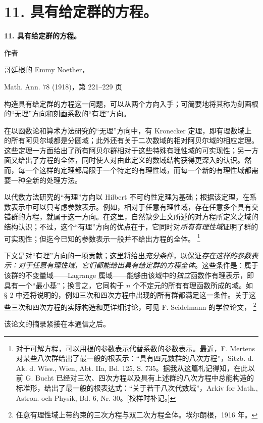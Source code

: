 \documentclass[11pt]{article}
\providecommand{\glqq}{“}
\providecommand{\grqq}{”}
\providecommand{\srcfn}[2]{%
  \begingroup
  \renewcommand{\thefootnote}{#1}%
  \footnote{#2}%
  \addtocounter{footnote}{-1}%
  \endgroup}
\begin{document}
\setcounter{footnote}{0}
\section*{11. 具有给定群的方程。}
\begin{center}
{\Large\bfseries 11. 具有给定群的方程。}\par
\vspace{0.75em}
作者\par
\vspace{0.75em}
哥廷根的 Emmy Noether，\par
\vspace{1.5em}
Math. Ann. 78 (1918)，第 221--229 页
\end{center}

\vspace{4em}

构造具有给定群的方程这一问题，可以从两个方向入手；可简要地将其称为刻画根的\glqq{}无理\grqq{}方向和刻画系数的\glqq{}有理\grqq{}方向。

在以函数论和算术方法研究的\glqq{}无理\grqq{}方向中，有 Kronecker 定理，即有理数域上的所有阿贝尔域都是分圆域；此外还有关于二次数域的相对阿贝尔域的相应定理。这些定理一方面给出了所有阿贝尔群相对于这些特殊有理性域的可实现性；另一方面又给出了方程的全体，同时使人对由此定义的数域结构获得更深入的认识。然而，每一个这样的定理都局限于一个特定的有理性域，而每一个新的有理性域都需要一种全新的处理方法。

以代数方法研究的\glqq{}有理\grqq{}方向以 Hilbert 不可约性定理为基础；根据该定理，在系数表示中可以只考虑参数表示。例如，相对于任意有理性域，存在任意多个具有交错群的方程，就属于这一方向。在这里，自然缺少上文所述的对方程所定义之域的结构认识；不过，这个\glqq{}有理\grqq{}方向的优点在于，它同时对\emph{所有有理性域}证明了群的可实现性；但迄今已知的参数表示一般并不给出方程的全体。\srcfn{*)}{对于可解方程，可以用根的参数表示代替系数的参数表示。最近，F. Mertens 对某些八次群给出了最一般的根表示：\glqq{}具有四元数群的八次方程\grqq{}，Sitzb. d. Ak. d. Wiss., Wien, Abt. IIa, Bd. 125, S. 735。据我从这篇札记得知，在此以前 G. Bucht 已经对三次、四次方程以及具有上述群的八次方程中总能构造的标准形，给出了最一般的根表达式：\glqq{}关于若干八次代数域\grqq{}，Arkiv for Math., Astron. och Physik, Bd. 6, Nr. 30。[校样时补记。]} 

下文是对\glqq{}有理\grqq{}方向的一项贡献；这里将给出\emph{充分条件}，以保证\emph{存在这样的参数表示：对于任意有理性域，它们都能给出具有给定群的方程全体}。这些条件是：属于该群的不变量域——Lagrange 属域——能够由该域中的\emph{独立}函数作有理表示，即具有一个\glqq{}最小基\grqq{}；换言之，它同构于 $n$ 个不定元的所有有理函数所成的域。如 § 2 中还将说明的，例如三次和四次方程中出现的所有群都满足这一条件。关于这些三次和四次方程的实际构造和更详细讨论，可见 F. Seidelmann 的学位论文，\srcfn{*)}{任意有理性域上带约束的三次方程与双二次方程全体。埃尔朗根，1916 年。}该论文的摘录紧接在本通信之后。
\end{document}
